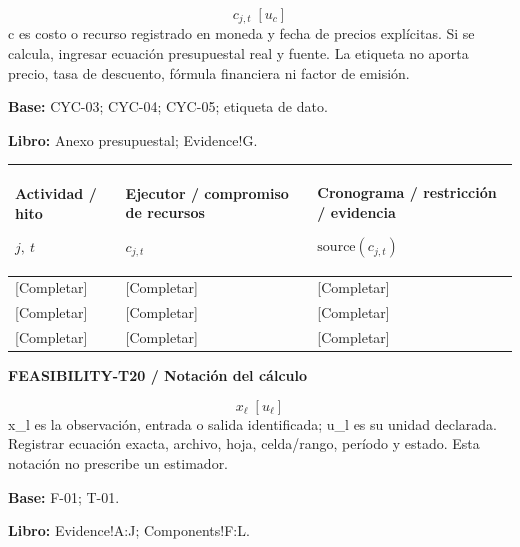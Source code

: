{\fontsize{9}{11}\selectfont\[ c_{j,t}\;[u_c] \]}
c es costo o recurso registrado en moneda y fecha de precios explícitas. Si se calcula, ingresar ecuación presupuestal real y fuente. La etiqueta no aporta precio, tasa de descuento, fórmula financiera ni factor de emisión.\par
\textbf{Base:} CYC-03; CYC-04; CYC-05; etiqueta de dato.\par
\textbf{Libro:} Anexo presupuestal; Evidence!G.\par\endgroup
{\sffamily\fontsize{8.3}{10.3}\selectfont\begin{longtable}{@{}P{52.79mm} P{59.39mm} P{52.79mm}@{}}
\toprule
\textbf{Actividad / hito}\par {\normalfont\fontsize{8.2}{10}\selectfont $j,\ t$} & \textbf{Ejecutor / compromiso de recursos}\par {\normalfont\fontsize{8.2}{10}\selectfont $c_{j,t}$} & \textbf{Cronograma / restricción / evidencia}\par {\normalfont\fontsize{8.2}{10}\selectfont $\text{source}(c_{j,t})$}\\\midrule\endhead
\rule{0pt}{7.7mm}[Completar] & [Completar] & [Completar]\\\hline
\rule{0pt}{7.7mm}[Completar] & [Completar] & [Completar]\\\hline
\rule{0pt}{7.7mm}[Completar] & [Completar] & [Completar]\\\hline
\end{longtable}}
\par\begingroup\sffamily\fontsize{8}{10}\selectfont\color{NEBGreen}\setlength{\parskip}{2pt}\setlength{\abovedisplayskip}{4pt}\setlength{\belowdisplayskip}{4pt}\setlength{\abovedisplayshortskip}{2pt}\setlength{\belowdisplayshortskip}{3pt}
\textbf{FEASIBILITY-T20 / Notación del cálculo}\par
{\fontsize{9}{11}\selectfont\[ x_{\ell}\;[u_{\ell}] \]}
x\_l es la observación, entrada o salida identificada; u\_l es su unidad declarada. Registrar ecuación exacta, archivo, hoja, celda/rango, período y estado. Esta notación no prescribe un estimador.\par
\textbf{Base:} F-01; T-01.\par
\textbf{Libro:} Evidence!A:J; Components!F:L.\par\endgroup
